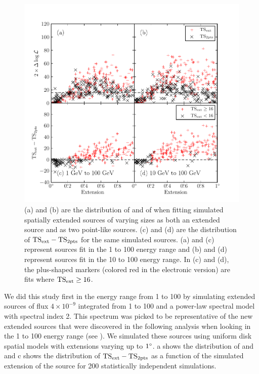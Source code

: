 \begin{figure}[htbp]
  \includegraphics{chapters/extended_analysis/figures/mc_plots/confusion_extended_plot_color.pdf}
  \caption{(a) and (b) are the distribution of \tsext and of \tsinc
  when fitting simulated spatially extended sources of varying sizes
  as both an extended source and as two point-like sources.  (c) and
  (d) are the distribution of $\mathrm{TS}_\mathrm{ext}-\mathrm{TS}_{\mathrm{2pts}}$ for the same simulated
  sources.  (a) and (c) represent sources fit in the 1 \gev to 100 \gev
  energy range and (b) and (d) represent sources fit in the 10 \gev
  to 100 \gev energy range.  In (c) and (d), the plus-shaped markers
  (colored red in the electronic version) are fits where $\mathrm{TS}_\mathrm{ext}\ge16$.}
\end{figure}

We did this study first in the energy range from 1 \gev to 100 \gev
by simulating extended sources of flux $4\times10^{-9}$ \fluxunits
integrated from 1 \gev to 100 \gev and a power-law spectral model
with spectral index 2.  This spectrum was picked to be representative
of the new extended sources that were discovered in the following
analysis when looking in the 1 \gev to 100 \gev energy range (see
).  We simulated these sources using
uniform disk spatial models with extensions varying up to $1^\circ$.
a shows the distribution of \tsext and
\tsinc and c shows the distribution of
$\mathrm{TS}_\mathrm{ext}-\mathrm{TS}_{\mathrm{2pts}}$ as a function of the simulated extension of the source
for 200 statistically independent simulations.

